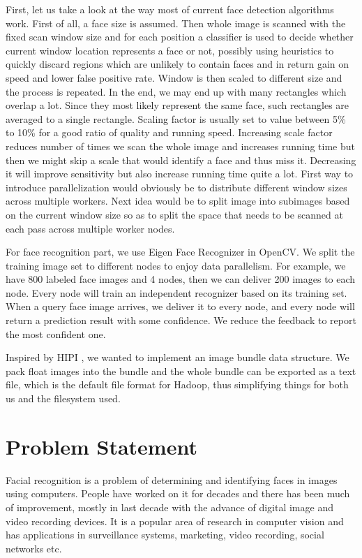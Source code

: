 \documentclass[11pt, draftclsnofoot, onecolumn]{IEEEtran}
\begin{document}
First, let us take a look at the way most of current face detection algorithms work. First of all, a face size is assumed. Then whole image is scanned with the fixed scan window size and for each position a classifier is used to decide whether current window location represents a face or not, possibly using heuristics to quickly discard regions which are unlikely to contain faces and in return gain on speed and lower false positive rate. Window is then scaled to different size and the process is repeated. In the end, we may end up with many rectangles which overlap a lot. Since they most likely represent the same face, such rectangles are averaged to a single rectangle. Scaling factor is usually set to value between 5\% to 10\% for a good ratio of quality and running speed. Increasing scale factor reduces number of times we scan the whole image and increases running time but then we might skip a scale that would identify a face and thus miss it. Decreasing it will improve sensitivity but also increase running time quite a lot. First way to introduce parallelization would obviously be to distribute different window sizes across multiple workers. Next idea would be to split image into subimages based on the current window size so as to split the space that needs to be scanned at each pass across multiple worker nodes.

For face recognition part, we use Eigen Face Recognizer in OpenCV. We split the training image set to different nodes to enjoy data parallelism. For example, we have 800 labeled face images and 4 nodes, then we can deliver 200 images to each node. Every node will train an independent recognizer based on its training set. When a query face image arrives, we deliver it to every node, and every node will return a prediction result with some confidence. We reduce the feedback to report the most confident one. 

Inspired by HIPI \cite{sweeney2011hipi}, we wanted to implement an image bundle data structure. We pack float images into the bundle and the whole bundle can be exported as a text file, which is the default file format for Hadoop, thus simplifying things for both us and the filesystem used.

\section{Problem Statement} \label{sec:problem}

Facial recognition is a problem of determining and identifying faces in images using computers. People have worked on it for decades and there has been much of improvement, mostly in last decade with the advance of digital image and video recording devices. It is a popular area of research in computer vision and has applications in surveillance systems, marketing, video recording, social networks etc.
\end{document}
